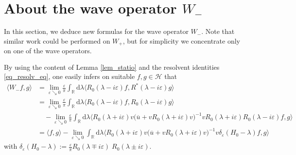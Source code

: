 \documentclass{article}
\def\d{\mathrm{d}}
\def\H{\mathcal H}
\def\R{\mathbb R}
\begin{document}
\section{About the wave operator $W_-$}\label{sec_W}
\setcounter{equation}{0}

In this section, we deduce new formulas for the wave operator $W_-$. Note that
similar work could be performed on $W_+$, but for simplicity we concentrate only
on one of the wave operators. 

By using the content of Lemma \ref{lem_statio} and the resolvent identities \eqref{eq_resolv_eq},
one easily infers  on suitable $f,g\in \H$ that
\begin{align*}
\langle W_- f,g\rangle
& =  \lim_{\varepsilon\searrow 0}\frac{\varepsilon}{\pi} \int_{\R}\d \lambda 
\langle R_0(\lambda- i \varepsilon)f, R^*(\lambda - i \varepsilon) g\rangle \\
& =  \lim_{\varepsilon\searrow 0}\frac{\varepsilon}{\pi} \int_{\R}\d \lambda 
\langle R_0(\lambda- i \varepsilon)f, R_0(\lambda - i \varepsilon) g\rangle \\
& \quad - \lim_{\varepsilon\searrow 0}\frac{\varepsilon}{\pi} \int_{\R}\d \lambda 
\langle  
R_0(\lambda+i\varepsilon) v\big(\overline{u} +v R_0(\lambda+i\varepsilon)v\big)^{-1}vR_0(\lambda+i\varepsilon) R_0(\lambda- i \varepsilon)f, g\rangle \\
& =  \langle f, g\rangle 
 - \lim_{\varepsilon\searrow 0} \int_{\R}\d \lambda 
\langle  
R_0(\lambda+i\varepsilon) v\big(\overline{u} +v R_0(\lambda+i\varepsilon)v\big)^{-1}v \delta_\varepsilon(H_0-\lambda)f, g\rangle 
\end{align*}
with
$
\delta_\varepsilon(H_0-\lambda)
:=\frac\varepsilon\pi R_0(\lambda\mp i\varepsilon)\;\!R_0(\lambda\pm i\varepsilon).
$
\end{document}
